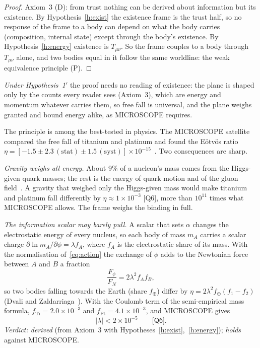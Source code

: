 \documentclass[11pt,a4paper]{article}
\theoremstyle{definition}
\theoremstyle{remark}
\newcommand{\chk}[1]{\textsf{[#1]}}
\newcommand{\tagD}{\textsf{(D)}}
\newcommand{\tagP}{\textsf{(P)}}
\newcommand{\vtag}{{\color{newc}\textsf{\scriptsize[v5.1]}}}
\newenvironment{vnew}{\color{newc}}{}
\theoremstyle{definition}
\begin{document}
\begin{proof}
Axiom~3 \tagD: from trust nothing can be derived about information but its existence. By Hypothesis~\ref{h:exist} the existence frame is
the trust half, so no response of the frame to a body can depend on what the body carries (composition, internal state) except through
the body's existence. By Hypothesis~\ref{h:energy} existence is $T_{\mu\nu}$. So the frame couples to a body through $T_{\mu\nu}$ alone,
and two bodies equal in it follow the same worldline: the weak equivalence principle \tagP.
\end{proof}

\begin{vnew}
\noindent\vtag{} \emph{Under Hypothesis~1$'$} the proof needs no reading of existence: the plane is shaped only by the counts every reader
sees (Axiom~3), which are energy and momentum whatever carries them, so free fall is universal, and the plane weighs granted and bound
energy alike, as MICROSCOPE requires.
\end{vnew}


The principle is among the best-tested in physics. The MICROSCOPE satellite compared the free fall of titanium and platinum and found the
E\"otv\"os ratio $\eta=[-1.5\pm2.3\,(\text{stat})\pm1.5\,(\text{syst})]\times10^{-15}$~\cite{microscope}. Two consequences are sharp.

\emph{Gravity weighs all energy.} About 9\% of a nucleon's mass comes from the Higgs-given quark masses; the rest is the energy of quark
motion and of the gluon field~\cite{yang}. A gravity that weighed only the Higgs-given mass would make titanium and platinum fall
differently by $\eta\approx1\times10^{-3}$ \chk{Q6}, more than $10^{11}$ times what MICROSCOPE allows. The frame weighs the binding in full.

\emph{The information scalar may barely pull.} A scalar that sets $\alpha$ changes the electrostatic energy of every nucleus, so each body
of mass $m_A$ carries a scalar charge $\partial\ln m_A/\partial\phi=\lambda f_A$, where $f_A$ is the electrostatic share of its mass. With the
normalisation of~\eqref{eq:action} the exchange of $\phi$ adds to the Newtonian force between $A$ and $B$ a fraction
\begin{equation}\label{eq:fifth}
\frac{F_\phi}{F_N}=2\lambda^2f_Af_B ,
\end{equation}
so two bodies falling towards the Earth (share $f_\oplus$) differ by $\eta=2\lambda^2f_\oplus(f_1-f_2)$ (Dvali and Zaldarriaga~\cite{dz}).
With the Coulomb term of the semi-empirical mass formula, $f_{\text{Ti}}=2.0\times10^{-3}$ and $f_{\text{Pt}}=4.1\times10^{-3}$, and
MICROSCOPE gives
\begin{equation}\label{eq:lambdabound}
|\lambda|<2\times10^{-5}\qquad\chk{Q6}.
\end{equation}
\emph{Verdict: derived} (from Axiom~3 with Hypotheses~\ref{h:exist},~\ref{h:energy}); \emph{holds} against MICROSCOPE.
\end{document}
